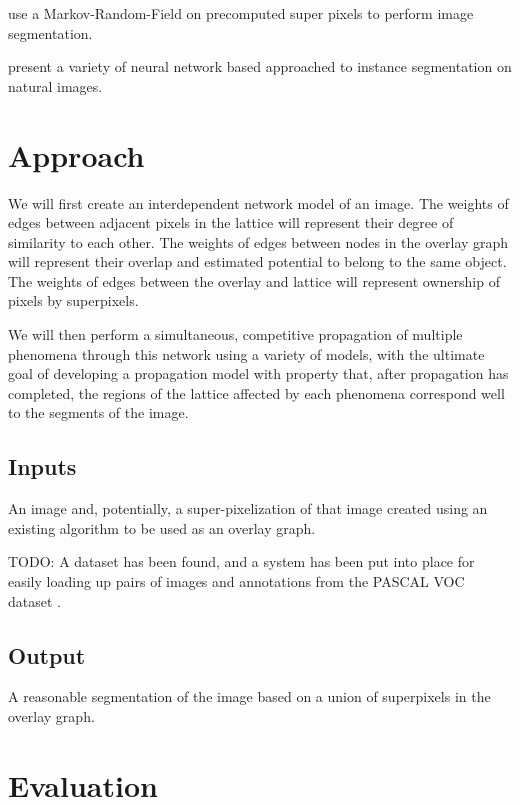 \documentclass[twocolumn]{article}
\newcommand{\todo}[1]{}
\renewcommand{\todo}[1]{{\color{red} TODO: {#1}}}
\newcommand{\seclab}[1]{\label{sec:#1}}
\begin{document}
\cite{pei2014saliency} use a Markov-Random-Field on precomputed super pixels to perform image segmentation.

\cite{newell2017associative,li2017fully,ren2017end} present a variety of neural network based approached to instance
segmentation on natural images.

\section{Approach}\seclab{approach}

We will first create an interdependent network model of an image. The weights of edges between adjacent pixels in the lattice
will represent their degree of similarity to each other. The weights of edges between nodes in the overlay graph will
represent their overlap and estimated potential to belong to the same object. The weights of edges between the overlay and
lattice will represent ownership of pixels by superpixels.

We will then perform a simultaneous, competitive propagation of multiple phenomena through this network using a variety of
models, with the ultimate goal of developing a propagation model with property that, after propagation has completed, the
regions of the lattice affected by each phenomena correspond well to the segments of the image.

\subsection{Inputs}

An image and, potentially, a super-pixelization of that image created using an existing algorithm to be used as an overlay
graph.

\todo{
A dataset has been found, and a system has been put into place for easily loading up pairs of images and annotations from the
PASCAL VOC dataset \cite{Everingham10}. 
}

\subsection{Output}

A reasonable segmentation of the image based on a union of superpixels in the overlay graph.

\section{Evaluation}\seclab{eval}
\end{document}

